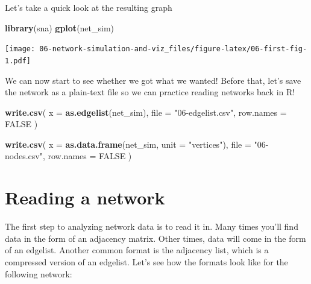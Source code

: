 \documentclass[]{book}
\newenvironment{Shaded}{\begin{snugshade}}{\end{snugshade}}
\newcommand{\DataTypeTok}[1]{\textcolor[rgb]{0.13,0.29,0.53}{#1}}
\newcommand{\KeywordTok}[1]{\textcolor[rgb]{0.13,0.29,0.53}{\textbf{#1}}}
\newcommand{\NormalTok}[1]{#1}
\newcommand{\OtherTok}[1]{\textcolor[rgb]{0.56,0.35,0.01}{#1}}
\newcommand{\StringTok}[1]{\textcolor[rgb]{0.31,0.60,0.02}{#1}}
\begin{document}
Let's take a quick look at the resulting graph

\begin{Shaded}
\begin{Highlighting}[]
\KeywordTok{library}\NormalTok{(sna)}
\KeywordTok{gplot}\NormalTok{(net_sim)}
\end{Highlighting}
\end{Shaded}

\texttt{[image: 06-network-simulation-and-viz\_files/figure-latex/06-first-fig-1.pdf]}

We can now start to see whether we got what we wanted! Before that, let's save the
network as a plain-text file so we can practice reading networks back in R!

\begin{Shaded}
\begin{Highlighting}[]
\KeywordTok{write.csv}\NormalTok{(}
  \DataTypeTok{x         =} \KeywordTok{as.edgelist}\NormalTok{(net_sim),}
  \DataTypeTok{file      =} \StringTok{"06-edgelist.csv"}\NormalTok{,}
  \DataTypeTok{row.names =} \OtherTok{FALSE}
\NormalTok{  )}

\KeywordTok{write.csv}\NormalTok{(}
  \DataTypeTok{x         =} \KeywordTok{as.data.frame}\NormalTok{(net_sim, }\DataTypeTok{unit =} \StringTok{"vertices"}\NormalTok{),}
  \DataTypeTok{file      =} \StringTok{"06-nodes.csv"}\NormalTok{,}
  \DataTypeTok{row.names =} \OtherTok{FALSE}
\NormalTok{  )}
\end{Highlighting}
\end{Shaded}

\hypertarget{reading-a-network}{%
\section{Reading a network}\label{reading-a-network}}

The first step to analyzing network data is to read it in. Many times you'll find
data in the form of an adjacency matrix. Other times, data will come in the form
of an edgelist. Another common format is the adjacency list, which is a compressed
version of an edgelist. Let's see how the formats look like for the following
network:
\end{document}
